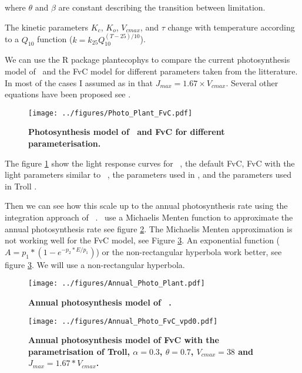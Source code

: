 \documentclass[a4paper,11pt]{article}
\begin{document}
where $\theta$ and $\beta$ are constant describing the transition between limitation.

The kinetic parameters $K_c$, $K_o$, $V_{cmax}$, and $\tau$ change with temperature according to a $Q_{10}$ function ($k = k_{25} Q_{10}^{(T-25)/10}$).

\clearpage

We can use the R package plantecophys \citep{Duursma-2015} to compare
the current photosynthesis model of \plant\ and the FvC model for
different parameters taken from the litterature. In most of the cases I assumed as in
\citet{Medlyn-2002} that $J_{max} = 1.67 \times V_{cmax}$. Several
other equations have been proposed see
\citet{Walker-2014,Kattge-2011}.


\begin{figure}[ht]
\centering
\texttt{[image: ../figures/Photo\_Plant\_FvC.pdf]}
\caption{\textbf{Photosynthesis model of \plant\ and FvC for different parameterisation.}
\label{fig:photo}}
\end{figure}

The figure \ref{fig:photo} show the light response curves for \plant\
, the default FvC, FvC with the light parameters similar to \plant\ , the parameters used in \citet{Sterck-2011}, and the parameters used in Troll \citep{Marechaux-2017}.

Then we can see how this scale up to the annual photosynthesis rate using the integration approach of \plant\ . \plant\ use a Michaelis Menten function to approximate the annual photosynthesis rate see figure \ref{fig:photo_annu_plant}. The Michaelis Menten approximation is not working well for the FvC model, see Figure \ref{fig:photo_annu_fvc}. An exponential function \citep{Chen-2016} ($A = p_1 *(1-e^{-p_2* E/p_1})$) or the non-rectangular hyperbola work better, see figure \ref{fig:photo_annu_fvc}. We will use a non-rectangular hyperbola.


\begin{figure}[ht]
\centering
\texttt{[image: ../figures/Annual\_Photo\_Plant.pdf]}
\caption{\textbf{Annual photosynthesis model of \plant\ .}
\label{fig:photo_annu_plant}}
\end{figure}


\begin{figure}[ht]
\centering
\texttt{[image: ../figures/Annual\_Photo\_FvC\_vpd0.pdf]}
\caption{\textbf{Annual photosynthesis model of FvC with the parametrisation of Troll, $\alpha = 0.3$, $\theta = 0.7$, $V_{cmax} = 38$ and $J_{max} = 1.67 * V_{cmax}$.}
\label{fig:photo_annu_fvc}}
\end{figure}
\end{document}

